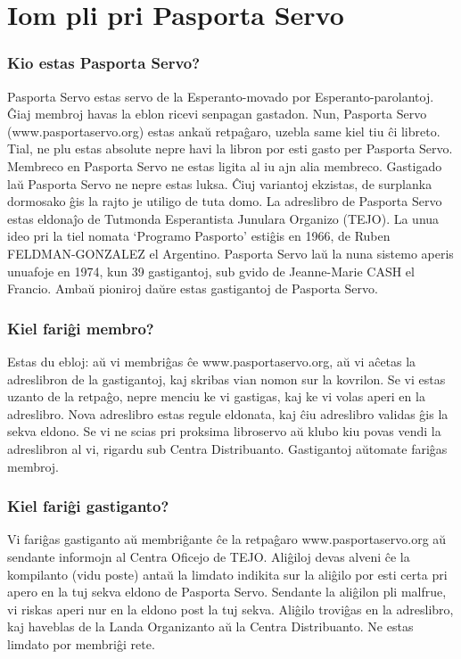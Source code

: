 \section{Iom pli pri Pasporta Servo}
\subsubsection{Kio estas Pasporta Servo?}
Pasporta Servo estas servo de la Esperanto-movado por Esperanto-parolantoj.
Ĝiaj membroj havas la eblon ricevi senpagan gastadon. Nun, Pasporta Servo
(www.pasportaservo.org) estas ankaŭ retpaĝaro, uzebla same kiel tiu ĉi libreto.
Tial, ne plu estas absolute nepre havi la libron por esti gasto per Pasporta Servo.
Membreco en Pasporta Servo ne estas ligita al iu ajn alia membreco.
Gastigado laŭ Pasporta Servo ne nepre estas luksa. Ĉiuj variantoj ekzistas, de
surplanka dormosako ĝis la rajto je utiligo de tuta domo. La adreslibro de Pasporta
Servo estas eldonaĵo de Tutmonda Esperantista Junulara Organizo (TEJO).
La unua ideo pri la tiel nomata ‘Programo Pasporto’ estiĝis en 1966, de Ruben
FELDMAN-GONZALEZ el Argentino. Pasporta Servo laŭ la nuna sistemo aperis
unuafoje en 1974, kun 39 gastigantoj, sub gvido de Jeanne-Marie CASH el Francio.
Ambaŭ pioniroj daŭre estas gastigantoj de Pasporta Servo.
\subsubsection{Kiel fariĝi membro?}
Estas du ebloj: aŭ vi membriĝas ĉe www.pasportaservo.org, aŭ vi aĉetas la adreslibron
de la gastigantoj, kaj skribas vian nomon sur la kovrilon. Se vi estas uzanto de la
retpaĝo, nepre menciu ke vi gastigas, kaj ke vi volas aperi en la adreslibro. Nova
adreslibro estas regule eldonata, kaj ĉiu adreslibro validas ĝis la sekva eldono.
Se vi ne scias pri proksima libroservo aŭ klubo kiu povas vendi la adreslibron al vi,
rigardu sub Centra Distribuanto. Gastigantoj aŭtomate fariĝas membroj.
\subsubsection{Kiel fariĝi gastiganto?}
Vi fariĝas gastiganto aŭ membriĝante ĉe la retpaĝaro www.pasportaservo.org aŭ
sendante informojn al Centra Oficejo de TEJO. Aliĝiloj devas alveni ĉe la kompilanto
(vidu poste) antaŭ la limdato indikita sur la aliĝilo por esti certa pri apero en la tuj
sekva eldono de Pasporta Servo. Sendante la aliĝilon pli malfrue, vi riskas aperi nur
en la eldono post la tuj sekva. Aliĝilo troviĝas en la adreslibro, kaj haveblas de la
Landa Organizanto aŭ la Centra Distribuanto. Ne estas limdato por membriĝi rete.
